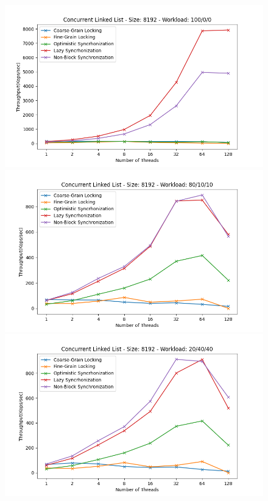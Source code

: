 \documentclass[../final_report.tex]{subfiles}
\begin{document}
\begin{figure}[H]
    \centering
        \includegraphics[scale=0.4]{outFiles/plots/concurrent_data_structs_all_8192_100_0_0.png}
        \includegraphics[scale=0.4]{outFiles/plots/concurrent_data_structs_all_8192_80_10_10.png}
        \includegraphics[scale=0.4]{outFiles/plots/concurrent_data_structs_all_8192_20_40_40.png}

\end{figure}
\end{document}
